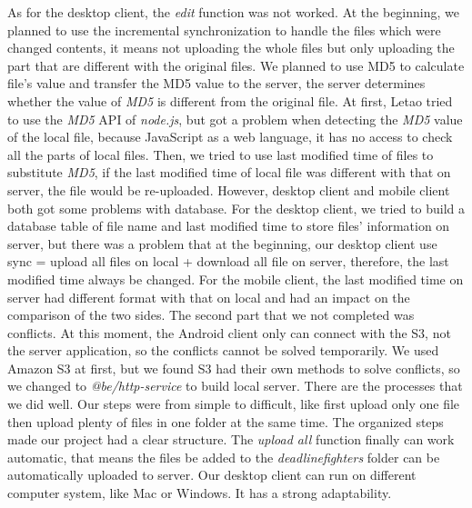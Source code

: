 \documentclass[a4paper]{article}
\begin{document}
\begin{flushleft}
As for the desktop client, the \emph{edit} function was not worked. At the beginning, we planned to use the incremental synchronization to handle the files which were changed contents, it means not uploading the whole files but only uploading the part that are different with the original files. We planned to use MD5 to calculate file’s value and transfer the MD5 value to the server, the server determines whether the value of \emph{MD5} is different from the original file.\newline
At first, Letao tried to use the \emph{MD5} API of \emph{node.js}, but got a problem when detecting the \emph{MD5} value of the local file, because JavaScript as a web language, it has no access to check all the parts of local files.\newline
Then, we tried to use last modified time of files to substitute \emph{MD5}, if the last modified time of local file was different with that on server, the file would be re-uploaded. However, desktop client and mobile client both got some problems with database. For the desktop client, we tried to build a database table of file name and last modified time to store files’ information on server, but there was a problem that at the beginning, our desktop client use sync = upload all files on local + download all file on server, therefore, the last modified time always be changed. For the mobile client, the last modified time on server had different format with that on local and had an impact on the comparison of the two sides.\newline
The second part that we not completed was conflicts. At this moment, the Android client only can connect with the S3, not the server application, so the conflicts cannot be solved temporarily. We used Amazon S3 at first, but we found S3 had their own methods to solve conflicts, so we changed to \emph{@be/http-service} to build local server.\newline
There are the processes that we did well. Our steps were from simple to difficult, like first upload only one file then upload plenty of files in one folder at the same time. The organized steps made our project had a clear structure. \newline
The \emph{upload all} function finally can work automatic, that means the files be added to the \emph{deadlinefighters} folder can be automatically uploaded to server.\newline
Our desktop client can run on different computer system, like Mac or Windows. It has a strong adaptability.\newline


\end{flushleft}
\end{document}
